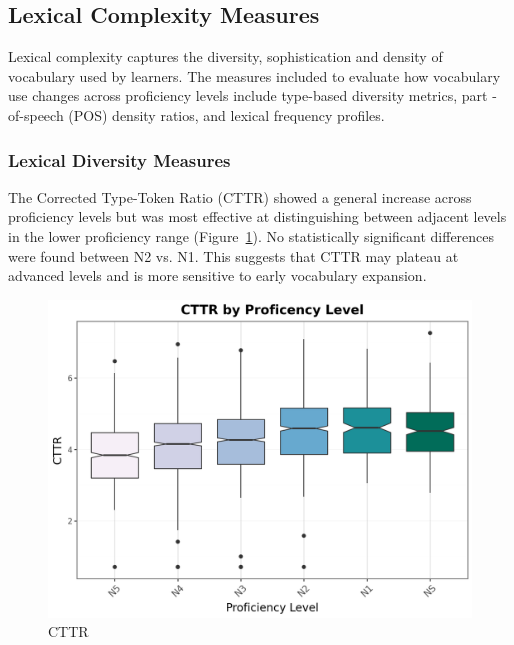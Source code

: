 \subsection{Lexical Complexity Measures}
Lexical complexity captures the diversity, sophistication and density of vocabulary used by learners. The measures
included to evaluate how vocabulary use changes across proficiency levels include type-based diversity metrics, part
-of-speech (POS) density ratios, and lexical frequency profiles.

\subsubsection{Lexical Diversity Measures}

The Corrected Type-Token Ratio (CTTR) showed a general increase across proficiency levels but was most effective at
distinguishing between adjacent levels in the lower proficiency range (Figure~\ref{fig:cttr}). No statistically significant
differences were
found between N2 vs. N1. This suggests that CTTR may plateau at advanced levels and is more sensitive to early
vocabulary expansion.

\begin{figure}[h]
    \centering
    \includegraphics[scale=.5]{img/CTTR}
    \caption[Correct-Type]{CTTR}
    \label{fig:cttr}
\end{figure}

